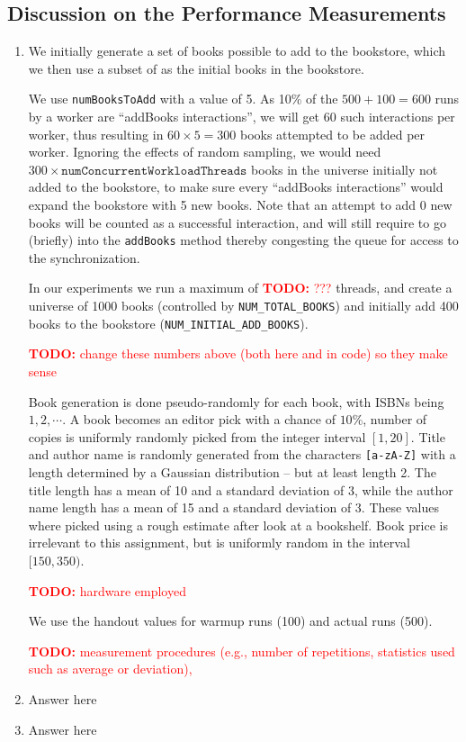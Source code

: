 \documentclass[11pt,a4paper,english]{article}
\newcommand{\todo}[1]{\textcolor{red}{\textbf{TODO: }#1}}
\begin{document}
\subsection*{Discussion on the Performance Measurements}
\begin{enumerate}
\item We initially generate a set of books possible to add to the bookstore,
  which we then use a subset of as the initial books in the bookstore.

  We use \verb|numBooksToAdd| with a value of 5. As 10\% of the $500+100 = 600$
  runs by a worker are ``addBooks interactions'', we will get $60$ such
  interactions per worker, thus resulting in $60 \times 5 = 300$ books attempted
  to be added per worker. Ignoring the effects of random sampling, we would need
  $300 \times \mathtt{numConcurrentWorkloadThreads}$ books in the universe
  initially not added to the bookstore, to make sure every ``addBooks
  interactions'' would expand the bookstore with 5 new books. Note that an
  attempt to add 0 new books will be counted as a successful interaction, and
  will still require to go (briefly) into the \verb|addBooks| method thereby
  congesting the queue for access to the synchronization.

  In our experiments we run a maximum of \todo{???} threads, and create a
  universe of 1000 books (controlled by \verb|NUM_TOTAL_BOOKS|) and initially
  add 400 books to the bookstore (\verb|NUM_INITIAL_ADD_BOOKS|).

  \todo{change these numbers above (both here and in code) so they make sense}

  Book generation is done pseudo-randomly for each book, with ISBNs being
  $1,2,\cdots$. A book becomes an editor pick with a chance of $10\%$, number of
  copies is uniformly randomly picked from the integer interval $[1,20]$. Title
  and author name is randomly generated from the characters \verb|[a-zA-Z]| with
  a length determined by a Gaussian distribution -- but at least length 2. The
  title length has a mean of 10 and a standard deviation of 3, while the author
  name length has a mean of 15 and a standard deviation of 3. These values where
  picked using a rough estimate after look at a bookshelf. Book price is
  irrelevant to this assignment, but is uniformly random in the interval
  $[150,350)$.

  \todo{hardware employed}

  We use the handout values for warmup runs (100) and actual runs (500).

  \todo{measurement procedures (e.g., number of repetitions, statistics used such as average or deviation),}

\item Answer here

\item Answer here
\end{enumerate}
\end{document}
